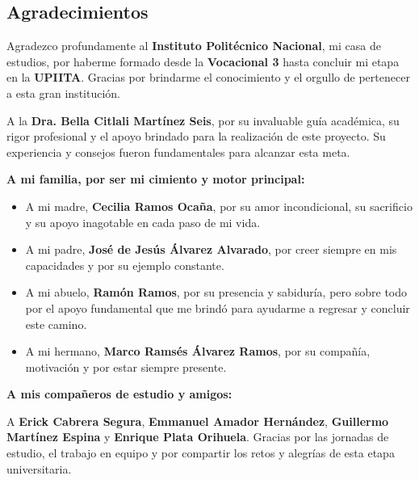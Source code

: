 
    \begin{center}
        \section*{Agradecimientos}
    \end{center}

    \justifying

    Agradezco profundamente al \textbf{Instituto Politécnico Nacional}, mi casa de estudios, por haberme formado desde la \textbf{Vocacional 3} hasta concluir mi etapa en la \textbf{UPIITA}. Gracias por brindarme el conocimiento y el orgullo de pertenecer a esta gran institución.

    A la \textbf{Dra. Bella Citlali Martínez Seis}, por su invaluable guía académica, su rigor profesional y el apoyo brindado para la realización de este proyecto. Su experiencia y consejos fueron fundamentales para alcanzar esta meta.

    \vspace{0.8cm}

    \noindent \textbf{A mi familia, por ser mi cimiento y motor principal:}

    \begin{itemize}
        \item A mi madre, \textbf{Cecilia Ramos Ocaña}, por su amor incondicional, su sacrificio y su apoyo inagotable en cada paso de mi vida.
        \item A mi padre, \textbf{José de Jesús Álvarez Alvarado}, por creer siempre en mis capacidades y por su ejemplo constante.
        \item A mi abuelo, \textbf{Ramón Ramos}, por su presencia y sabiduría, pero sobre todo por el apoyo fundamental que me brindó para ayudarme a regresar y concluir este camino.
        \item A mi hermano, \textbf{Marco Ramsés Álvarez Ramos}, por su compañía, motivación y por estar siempre presente.
    \end{itemize}

    \vspace{0.8cm}

    \noindent \textbf{A mis compañeros de estudio y amigos:}

    \noindent A \textbf{Erick Cabrera Segura}, \textbf{Emmanuel Amador Hernández}, \textbf{Guillermo Martínez Espina} y \textbf{Enrique Plata Orihuela}. Gracias por las jornadas de estudio, el trabajo en equipo y por compartir los retos y alegrías de esta etapa universitaria.

